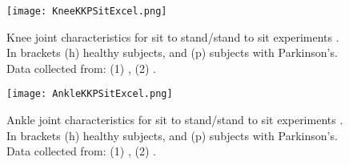 \begin{figure}[htbp]
    \centering
    \texttt{[image: KneeKKPSitExcel.png]}
    \caption[Knee joint characteristics for sit to stand/stand to sit experiments. In brackets (h) healthy subjects, and (p) subjects with Parkinson's.]{Knee joint characteristics for sit to stand/stand to sit experiments \cite{solis2017characterization}. In brackets (h) healthy subjects, and (p) subjects with Parkinson's. Data collected from: (1) \cite{roebroeck1994biomechanics}, (2) \cite{mak2003joint}.  }
    \label{fig:kneeKKPSit}
\end{figure}

\begin{figure}[htbp]
    \centering
    \texttt{[image: AnkleKKPSitExcel.png]}
    \caption[Ankle joint characteristics for sit to stand/stand to sit experiments. In brackets (h) healthy subjects, and (p) subjects with Parkinson's.]{Ankle joint characteristics for sit to stand/stand to sit experiments \cite{solis2017characterization}. In brackets (h) healthy subjects, and (p) subjects with Parkinson's. Data collected from: (1) \cite{roebroeck1994biomechanics}, (2) \cite{mak2003joint}.  }
    \label{fig:ankleKKPSit}
\end{figure}

